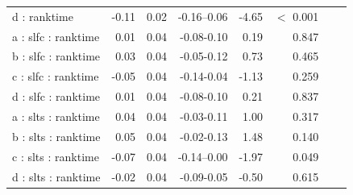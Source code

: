 \documentclass[pdflatex,sn-mathphys-num]{sn-jnl}%
\theoremstyle{thmstyleone}%
\theoremstyle{thmstyletwo}%
\theoremstyle{thmstylethree}%
\begin{document}
\begin{appendices}
\begin{table}[h!]
\begin{tabular}{lrrrrrrr}
   d : ranktime & -0.11 & 0.02 & -0.16--0.06 & -4.65 &  $<$  0.001 \\ 
   a : slfc : ranktime & 0.01 & 0.04 & -0.08-0.10 & 0.19 &    0.847 \\ 
   b : slfc : ranktime & 0.03 & 0.04 & -0.05-0.12 & 0.73 &    0.465 \\ 
   c : slfc : ranktime & -0.05 & 0.04 & -0.14-0.04 & -1.13 &    0.259 \\ 
   d : slfc : ranktime & 0.01 & 0.04 & -0.08-0.10 & 0.21 &    0.837 \\ 
   a : slts : ranktime & 0.04 & 0.04 & -0.03-0.11 & 1.00 &    0.317 \\ 
   b : slts : ranktime & 0.05 & 0.04 & -0.02-0.13 & 1.48 &    0.140 \\ 
   c : slts : ranktime & -0.07 & 0.04 & -0.14--0.00 & -1.97 &    0.049 \\ 
   d : slts : ranktime & -0.02 & 0.04 & -0.09-0.05 & -0.50 &    0.615 \\ 
   \hline
\end{tabular}
\end{table}




\end{appendices}
\end{document}
